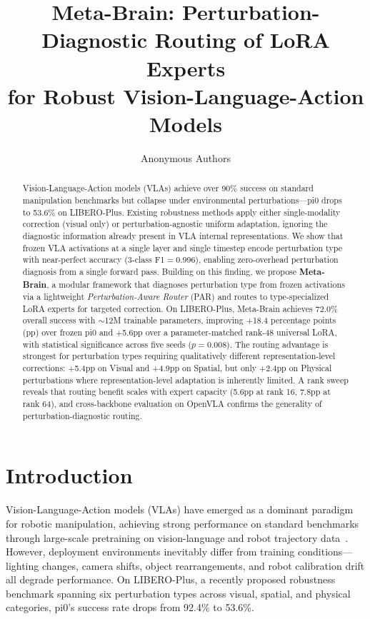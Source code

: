 \documentclass[10pt,twocolumn]{article}
\title{Meta-Brain: Perturbation-Diagnostic Routing of LoRA Experts\\for Robust Vision-Language-Action Models}
\author{
  Anonymous Authors
}
\begin{document}
\maketitle

\begin{abstract}
Vision-Language-Action models (VLAs) achieve over 90\% success on standard manipulation benchmarks but collapse under environmental perturbations---pi0 drops to 53.6\% on LIBERO-Plus.
Existing robustness methods apply either single-modality correction (visual only) or perturbation-agnostic uniform adaptation, ignoring the diagnostic information already present in VLA internal representations.
We show that frozen VLA activations at a single layer and single timestep encode perturbation type with near-perfect accuracy (3-class F1$=$0.996), enabling zero-overhead perturbation diagnosis from a single forward pass.
Building on this finding, we propose \textbf{Meta-Brain}, a modular framework that diagnoses perturbation type from frozen activations via a lightweight \emph{Perturbation-Aware Router} (PAR) and routes to type-specialized LoRA experts for targeted correction.
On LIBERO-Plus, Meta-Brain achieves 72.0\% overall success with ${\sim}$12M trainable parameters, improving +18.4 percentage points (pp) over frozen pi0 and +5.6pp over a parameter-matched rank-48 universal LoRA, with statistical significance across five seeds ($p{=}0.008$).
The routing advantage is strongest for perturbation types requiring qualitatively different representation-level corrections: +5.4pp on Visual and +4.9pp on Spatial, but only +2.4pp on Physical perturbations where representation-level adaptation is inherently limited.
A rank sweep reveals that routing benefit scales with expert capacity (5.6pp at rank 16, 7.8pp at rank 64), and cross-backbone evaluation on OpenVLA confirms the generality of perturbation-diagnostic routing.
\end{abstract}

\section{Introduction}
\label{sec:intro}

Vision-Language-Action models (VLAs) have emerged as a dominant paradigm for robotic manipulation, achieving strong performance on standard benchmarks through large-scale pretraining on vision-language and robot trajectory data~\cite{black2024pi0,kim2024openvla}.
However, deployment environments inevitably differ from training conditions---lighting changes, camera shifts, object rearrangements, and robot calibration drift all degrade performance.
On LIBERO-Plus, a recently proposed robustness benchmark spanning six perturbation types across visual, spatial, and physical categories, pi0's success rate drops from 92.4\% to 53.6\%.
\end{document}

